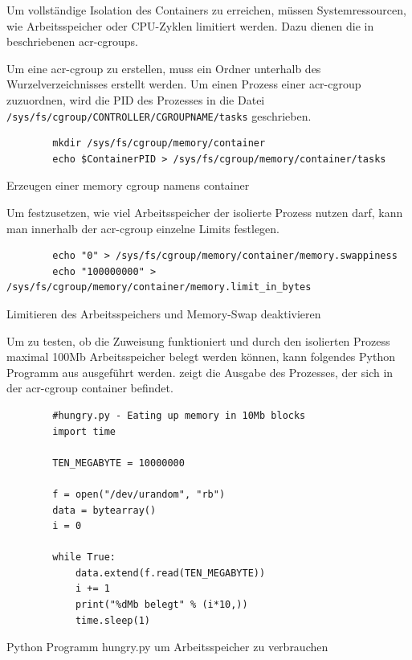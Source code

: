 Um vollständige Isolation des Containers zu erreichen, müssen Systemressourcen, wie Arbeitsspeicher oder CPU-Zyklen limitiert werden. Dazu dienen die in  beschriebenen \glspl{acr-cgroup}.

Um eine \gls{acr-cgroup} zu erstellen, muss ein Ordner unterhalb des Wurzelverzeichnisses erstellt werden. Um einen Prozess einer \gls{acr-cgroup} zuzuordnen, wird die PID des Prozesses in die Datei \texttt{/sys/fs/cgroup/CONTROLLER/CGROUPNAME/tasks} geschrieben.

\begin{listing}[h]
	\begin{verbatim}
		mkdir /sys/fs/cgroup/memory/container
		echo $ContainerPID > /sys/fs/cgroup/memory/container/tasks
	\end{verbatim}
	\caption{Erzeugen einer memory cgroup namens container}
\end{listing}

Um festzusetzen, wie viel Arbeitsspeicher der isolierte Prozess nutzen darf, kann man innerhalb der \gls{acr-cgroup} einzelne Limits festlegen.

\begin{listing}[h]
	\begin{verbatim}
		echo "0" > /sys/fs/cgroup/memory/container/memory.swappiness
		echo "100000000" > /sys/fs/cgroup/memory/container/memory.limit_in_bytes
	\end{verbatim}
	\caption{Limitieren des Arbeitsspeichers und Memory-Swap deaktivieren}
\end{listing}

Um zu testen, ob die Zuweisung funktioniert und durch den isolierten Prozess maximal \tildeawesome100Mb Arbeitsspeicher belegt werden können, kann folgendes Python Programm aus  ausgeführt werden.  zeigt die Ausgabe des Prozesses, der sich in der \gls{acr-cgroup} container befindet.

\begin{listing}[h]
	\begin{verbatim}
		#hungry.py - Eating up memory in 10Mb blocks
		import time
		
		TEN_MEGABYTE = 10000000
		
		f = open("/dev/urandom", "rb")
		data = bytearray()
		i = 0
		
		while True:
			data.extend(f.read(TEN_MEGABYTE))
			i += 1
			print("%dMb belegt" % (i*10,))
			time.sleep(1)
	\end{verbatim}
	\caption{Python Programm hungry.py um Arbeitsspeicher zu verbrauchen}
	\label{lst:hungry-py}
\end{listing}


